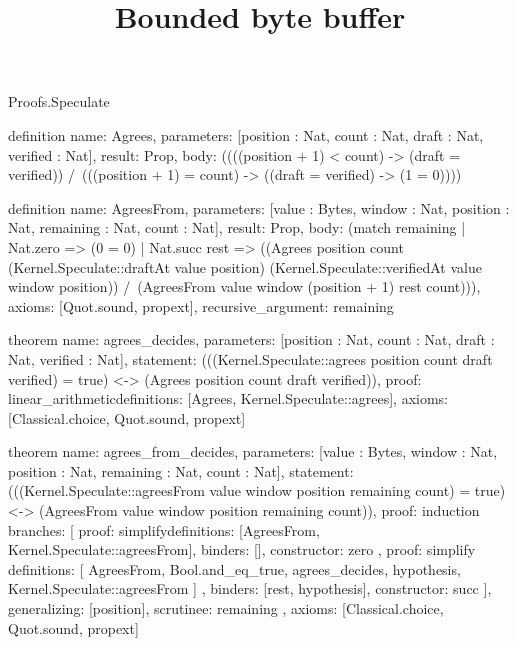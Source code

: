 \begin{lexlean}{Proofs.Speculate}
\title{Bounded byte buffer}
\begin{semanticmodule}
definition{
  name: Agrees,
  parameters: [position : Nat, count : Nat, draft : Nat, verified : Nat],
  result: Prop,
  body: ((((position + 1) < count) -> (draft = verified)) /\ (((position + 1) = count) -> ((draft = verified) -> (1 = 0))))
}

definition{
  name: AgreesFrom,
  parameters: [value : Bytes, window : Nat, position : Nat, remaining : Nat, count : Nat],
  result: Prop,
  body: (match remaining
    | Nat.zero => (0 = 0)
    | Nat.succ rest => ((Agrees position count (Kernel.Speculate::draftAt value position) (Kernel.Speculate::verifiedAt value window position)) /\ (AgreesFrom value window (position + 1) rest count))),
  axioms: [Quot.sound, propext],
  recursive_argument: remaining
}

theorem{
  name: agrees_decides,
  parameters: [position : Nat, count : Nat, draft : Nat, verified : Nat],
  statement: (((Kernel.Speculate::agrees position count draft verified) = true) <-> (Agrees position count draft verified)),
  proof: linear_arithmetic{definitions: [Agrees, Kernel.Speculate::agrees]},
  axioms: [Classical.choice, Quot.sound, propext]
}

theorem{
  name: agrees_from_decides,
  parameters: [value : Bytes, window : Nat, position : Nat, remaining : Nat, count : Nat],
  statement: (((Kernel.Speculate::agreesFrom value window position remaining count) = true) <-> (AgreesFrom value window position remaining count)),
  proof: induction{
    branches: [
      {
        proof: simplify{definitions: [AgreesFrom, Kernel.Speculate::agreesFrom]},
        binders: [],
        constructor: zero
      },
      {
        proof: simplify{
          definitions: [
            AgreesFrom,
            Bool.and_eq_true,
            agrees_decides,
            hypothesis,
            Kernel.Speculate::agreesFrom
          ]
        },
        binders: [rest, hypothesis],
        constructor: succ
      }
    ],
    generalizing: [position],
    scrutinee: remaining
  },
  axioms: [Classical.choice, Quot.sound, propext]
}
\end{semanticmodule}
\end{lexlean}

